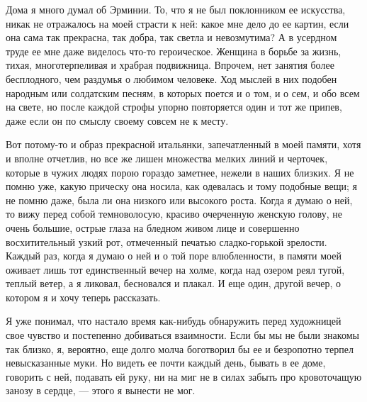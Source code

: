 Дома  я много  думал  об Эрминии.  То,  что я  не  был поклонником  ее
искусства, никак не  отражалось на моей страсти к ней:  какое мне дело
до  ее картин,  если она  сама так  прекрасна, так  добра, так  светла
и  невозмутима?  А  в  усердном  труде ее  мне  даже  виделось  что-то
героическое.  Женщина  в борьбе  за  жизнь,  тихая, многотерпеливая  и
храбрая  подвижница.  Впрочем,  нет  занятия  более  бесплодного,  чем
раздумья о  любимом человеке.  Ход мыслей в  них подобен  народным или
солдатским песням, в  которых поется и о  том, и о сем, и  обо всем на
свете, но после каждой строфы упорно повторяется один и тот же припев,
даже если он по смыслу своему совсем не к месту.

Вот  потому-то  и образ  прекрасной  итальянки,  запечатленный в  моей
памяти, хотя и вполне отчетлив, но все же лишен множества мелких линий
и черточек,  которые в  чужих людях порою  гораздо заметнее,  нежели в
наших  близких.  Я  не  помню  уже, какую  прическу  она  носила,  как
одевалась и тому  подобные вещи; я не помню даже,  была ли она низкого
или  высокого  роста.  Когда  я  думаю о  ней,  то  вижу  перед  собой
темноволосую,  красиво очерченную  женскую голову,  не очень  большие,
острые глаза на  бледном живом лице и  совершенно восхитительный узкий
рот, отмеченный  печатью сладко-горькой зрелости. Каждый  раз, когда я
думаю о ней и о той поре  влюбленности, в памяти моей оживает лишь тот
единственный  вечер на  холме,  когда над  озером  реял тугой,  теплый
ветер, а я  ликовал, бесновался и плакал. И еще  один, другой вечер, о
котором я и хочу теперь рассказать.

Я  уже   понимал,  что  настало  время   как-нибудь  обнаружить  перед
художницей свое чувство и постепенно добиваться взаимности. Если бы мы
не были знакомы так близко, я, вероятно, еще долго молча боготворил бы
ее и безропотно  терпел невысказанные муки. Но видеть  ее почти каждый
день, бывать в ее доме, говорить с ней, подавать ей руку, ни на миг не
в силах забыть  про кровоточащую занозу в сердце, ---  этого я вынести
не мог.

